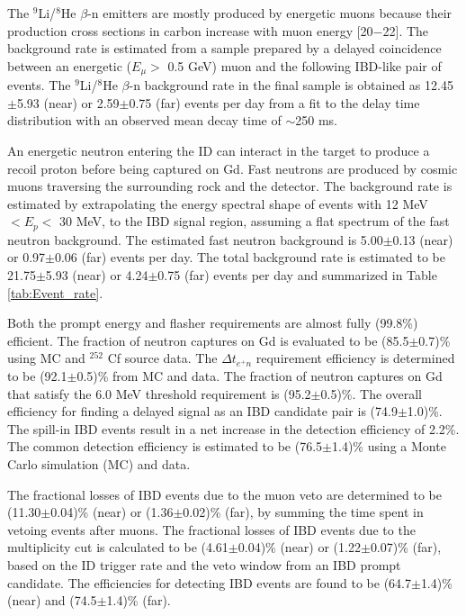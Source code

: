 \documentclass[aps,prl,twocolumn,superscriptaddress,showpacs]{revtex4-1}
\begin{document}
The $^9$Li/$^8$He $\beta$-n emitters are mostly produced by energetic muons because their production cross sections in carbon increase with muon energy [20$-$22]. The background rate is estimated from a sample prepared by a delayed coincidence between an energetic ($E_{\mu} >$ 0.5 GeV) muon and the following IBD-like pair of events. The $^9$Li/$^8$He $\beta$-n background rate in the final sample is obtained as 12.45$\pm$5.93 (near) or 2.59$\pm$0.75 (far) events per day from a fit to the delay time distribution with an observed mean decay time of $\sim$250 ms.

An energetic neutron entering the ID can interact in the target to produce a recoil proton before being captured on Gd. Fast neutrons are produced by cosmic muons traversing the surrounding rock and the detector. The background rate is estimated by extrapolating the energy spectral shape of events with 12 MeV $< E_p <$ 30 MeV, to the IBD signal region, assuming a flat spectrum of the fast neutron background. The estimated fast neutron background is 5.00$\pm$0.13 (near) or 0.97$\pm$0.06 (far) events per day. The total background rate is estimated to be 21.75$\pm$5.93 (near) or 4.24$\pm$0.75 (far) events per day and summarized in Table \ref{tab:Event_rate}. 

Both the prompt energy and flasher requirements are almost fully (99.8\%) efficient. The fraction of neutron captures on Gd is evaluated to be (85.5$\pm$0.7)\% using MC and $^{252}$ Cf source data. The $\Delta t_{e^+ n}$ requirement efficiency is determined to be (92.1$\pm$0.5)\% from MC and data. The fraction of neutron captures on Gd that satisfy the 6.0 MeV threshold requirement is (95.2$\pm$0.5)\%. The overall efficiency for finding a delayed signal as an IBD candidate pair is (74.9$\pm$1.0)\%. The spill-in IBD events result in a net increase in the detection efficiency of 2.2\%. The common detection efficiency is estimated to be (76.5$\pm$1.4)\% using a Monte Carlo simulation (MC) and data. 

The fractional losses of IBD events due to the muon veto are determined to be (11.30$\pm$0.04)\% (near) or (1.36$\pm$0.02)\% (far), by summing the time spent in vetoing events after muons. The fractional losses of IBD events due to the multiplicity cut is calculated to be (4.61$\pm$0.04)\% (near) or (1.22$\pm$0.07)\% (far), based on the ID trigger rate and the veto window from an IBD prompt candidate. The efficiencies for detecting IBD events are found to be (64.7$\pm$1.4)\% (near) and (74.5$\pm$1.4)\% (far).
\end{document}
